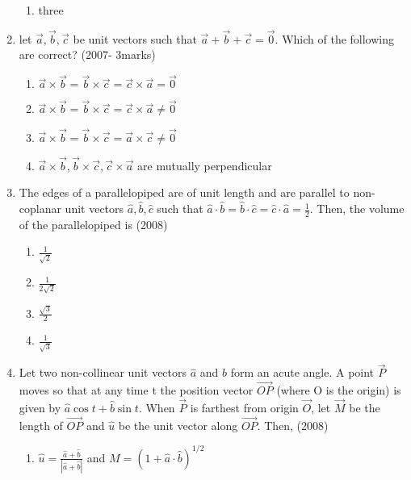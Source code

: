 \documentclass[journal,12pt,twocolumn]{IEEEtran}
\theoremstyle{remark}
\begin{document}
\begin{enumerate}
\begin{multicols}{2}
\begin{enumerate}
    \item three
    \end{enumerate}
    \end{multicols}
    \item let $\vec{a},\vec{b},\vec{c}$ be unit vectors such that $\vec{a}+\vec{b}+\vec{c}=\vec{0}$. Which of the following are correct?
    \hfill{(2007- 3marks)}
    \begin{enumerate}
    \item $\vec{a} \times \vec{b} = \vec{b} \times \vec{c} = \vec{c} \times \vec{a} = \vec{0}$
    \item $\vec{a} \times \vec{b} = \vec{b} \times \vec{c} = \vec{c} \times \vec{a} \neq \vec{0}$
    \item $\vec{a} \times \vec{b} = \vec{b} \times \vec{c} = \vec{a} \times \vec{c} \neq \vec{0}$
    \item $\vec{a} \times \vec{b}, \vec{b} \times \vec{c}, \vec{c} \times \vec{a}$ are mutually perpendicular
    \end{enumerate}
    \item The edges of a parallelopiped are of unit length and are parallel to non-coplanar unit vectors $\hat{a},\hat{b},\hat{c}$ such that $\hat{a} \cdot \hat{b}= \hat{b} \cdot \hat{c}= \hat{c} \cdot \hat{a}= \frac{1}{2}$. Then, the volume of the parallelopiped is 
    \hfill{(2008)}
    \begin{multicols}{2}
    \begin{enumerate}
    \item $\frac{1}{\sqrt{2}}$
    \item $\frac{1}{2\sqrt{2}}$
    \item $\frac{\sqrt{3}}{2}$
    \item $\frac{1}{\sqrt{3}}$
    \end{enumerate}
    \end{multicols}
    \item Let two non-collinear unit vectors $\hat{a}$ and $\hat{b}$ form an acute angle. A point $\vec{P}$ moves so that at any time t the position vector $\overrightarrow{OP}$ (where O is the origin) is given by $\hat{a}\cos{t} + \hat{b}\sin{t}$. When $\vec{P}$ is farthest from origin $\vec{O}$, let $\vec{M}$ be the length of $\overrightarrow{OP}$ and $\hat{u}$ be the unit vector along $\overrightarrow{OP}$. Then,
    \hfill{(2008)}
    \begin{enumerate}
    \item $\hat{u} = \frac{\hat{a}+\hat{b}}{|\hat{a}+\hat{b}|}$  and $M = (1+\hat{a} \cdot \hat{b})^{1/2}$

\end{enumerate}
\end{enumerate}
\end{document}
